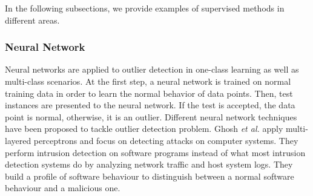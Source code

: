 In the following subsections, we provide examples of supervised methods in different areas.

%	
%	


\subsubsection{Neural Network}
Neural networks are applied to outlier detection in one-class learning as well as multi-class  scenarios. At the first step, a neural network is trained on normal training data in order to learn the normal behavior of data points. Then, test instances are presented to the neural network. If the test is accepted, the data point is normal, otherwise, it is an outlier. Different neural network techniques have been proposed to tackle outlier detection problem. Ghosh {\em et al.} \cite{Ghosh98} apply multi-layered perceptrons and focus on detecting attacks on computer systems. They perform intrusion detection on software programs instead of what most intrusion detection systems do by analyzing network traffic and host system logs. They build a profile of software behaviour to distinguish between a normal software behaviour and a malicious one.

